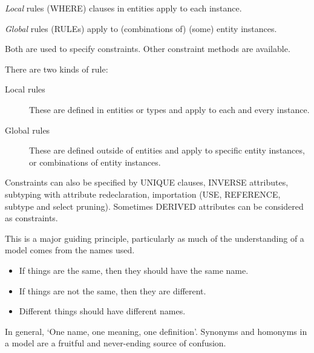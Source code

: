 \begin{remarks}
\remintro
{}

\emph{Local} rules (WHERE) clauses in entities apply to each instance.

\emph{Global} rules (RULEs) apply to (combinations of) (some) entity
instances.

    Both are used to specify constraints. Other constraint methods
are available.

\remend
\end{remarks}


There are two kinds of rule:

\begin{description}
\item[Local rules] These are defined in entities or types and apply
to each and every instance.
\item[Global rules] These are defined outside of entities and apply to
specific entity instances, or combinations of entity instances.
\end{description}

Constraints can also be specified by UNIQUE clauses, INVERSE attributes,
subtyping with attribute redeclaration, importation (USE, REFERENCE,
subtype and select pruning).
Sometimes DERIVED attributes can be considered as constraints.


\begin{remarks}
\remintro
{}

    This is a major guiding principle, particularly as much
of the understanding of a model comes from the names used.

\remend
\end{remarks}


\begin{itemize}
\item If things are the same, then they should have the same name.

\item If things are not the same, then they are different.

\item Different things should have different names.
\end{itemize}

In general, `One name, one meaning, one definition'. Synonyms and
homonyms in a model are a fruitful and never-ending source of confusion.


